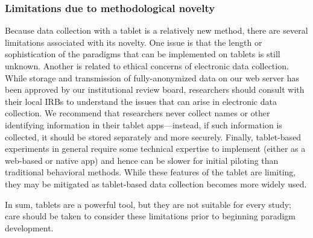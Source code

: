 \documentclass[man,noapacite]{apa2}
\begin{document}
\subsubsection{Limitations due to methodological novelty}
Because data collection with a tablet is a relatively new method, there are several limitations associated with its novelty. One issue is that the length or sophistication of the paradigms that can be implemented on tablets is still unknown. Another is related to  ethical concerns of electronic data collection. While storage and transmission of fully-anonymized data on our web server has been approved by our institutional review board, researchers should consult with their local IRBs to understand the issues that can arise in electronic data collection. We recommend that researchers never collect names or other identifying information in their tablet apps---instead, if such information is collected, it should be stored separately and more securely. Finally, tablet-based experiments in general require some technical expertise to implement (either as a web-based or native app) and hence can be slower for initial piloting than traditional behavioral methods. While these features of the tablet are limiting, they may be mitigated as tablet-based data collection becomes more widely used.

In sum, tablets are a powerful tool, but they are not suitable for every study; care should be taken to consider these limitations prior to beginning paradigm development. 


\end{document}
